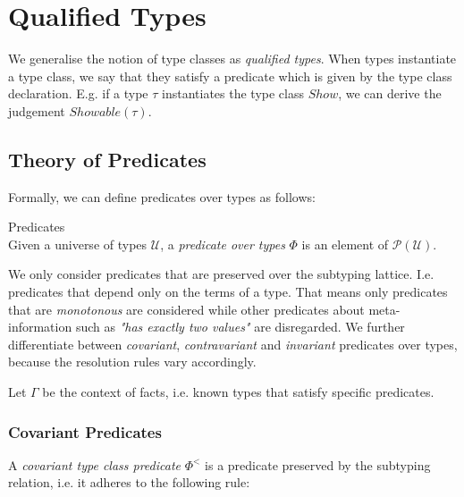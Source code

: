 \chapter{Qualified Types}
\label{ch:qualified-types}

We generalise the notion of type classes as \emph{qualified types}. \cite{jones2003qualified}
When types instantiate a type class, we say that they satisfy a predicate which is given by the type class declaration.
E.g. if a type $\tau$ instantiates the type class $\mathit{Show}$, we can derive the judgement $\mathit{Showable}(\tau)$.

\section{Theory of Predicates}
\label{sec:theory-predicates}

Formally, we can define predicates over types as follows:

\begin{definition} Predicates\\
  Given a universe of types $\mathcal{U}$, a \emph{predicate over types} $\Phi$ is an element of $\mathcal{P}(\mathcal{U})$.
\end{definition}

We only consider predicates that are preserved over the subtyping lattice.
I.e. predicates that depend only on the terms of a type.
That means only predicates that are \emph{monotonous} are considered while other predicates about meta-information such as \emph{"has exactly two values"} are disregarded.
We further differentiate between \emph{covariant}, \emph{contravariant} and \emph{invariant} predicates over types, because the resolution rules vary accordingly.

Let $\Gamma$ be the context of facts, i.e. known types that satisfy specific predicates.

\subsection{Covariant Predicates}
\label{sec:covariant-predicates}



\begin{definition}
  A \emph{covariant type class predicate} $\Phi^<$ is a predicate preserved by the subtyping relation, i.e. it adheres to the following rule:
\end{definition}


